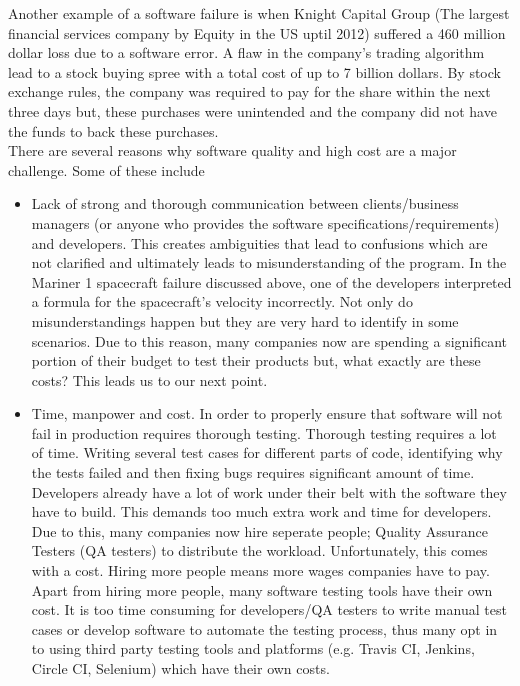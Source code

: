 \documentclass[12pt]{article}
\begin{document}
\begin{enumerate}[(a)]
Another example of a software failure is when Knight Capital Group (The largest financial services company by Equity in the US uptil 2012) suffered a 460 million dollar loss due to a software error. A flaw in the company's trading algorithm lead to a stock buying spree with a total cost of up to 7 billion dollars. By stock exchange rules, the company was required to pay for the share within the next three days but, these purchases were unintended and the company did not have the funds to back these purchases. \\
There are several reasons why software quality and high cost are a major challenge. Some of these include

\begin{itemize}
\item Lack of strong and thorough communication between clients/business managers (or anyone who provides the software specifications/requirements) and developers. This creates ambiguities that lead to confusions which are not clarified and ultimately leads to misunderstanding of the program. In the Mariner 1 spacecraft failure discussed above, one of the developers interpreted a formula for the spacecraft's velocity incorrectly. Not only do misunderstandings happen but they are very hard to identify in some scenarios. Due to this reason, many companies now are spending a significant portion of their budget to test their products but, what exactly are these costs? This leads us to our next point.

\item Time, manpower and cost. In order to properly ensure that software will not fail in production requires thorough testing. Thorough testing requires a lot of time. Writing several test cases for different parts of code, identifying why the tests failed and then fixing bugs requires significant amount of time. Developers already have a lot of work under their belt with the software they have to build. This demands too much extra work and time for developers. Due to this, many companies now hire seperate people; Quality Assurance Testers (QA testers) to distribute the workload. Unfortunately, this comes with a cost. Hiring more people means more wages companies have to pay. Apart from hiring more people, many software testing tools have their own cost. It is too time consuming for developers/QA testers to write manual test cases or develop software to automate the testing process, thus many opt in to using third party testing tools and platforms (e.g. Travis CI, Jenkins, Circle CI, Selenium) which have their own costs.


\end{itemize}
\end{enumerate}
\end{document}
